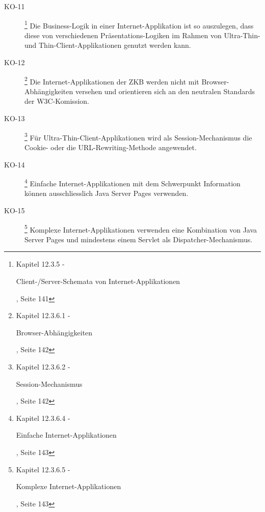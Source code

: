 \begin{description}
    \item[KO-11\label{itm:KO-11}]
    \footnote{\cite{ZkbHandbuchDerItArchitektur} Kapitel 12.3.5 -
    \begin{itshape}Client-/Server-Schemata von Internet-Applikationen\end{itshape}, Seite 141}
    Die Business-Logik in einer Internet-Applikation ist so auszulegen, dass
    diese von verschiedenen Präsentations-Logiken im Rahmen von Ultra-Thin- und
    Thin-Client-Applikationen genutzt werden kann.
    
    \item[KO-12\label{itm:KO-12}]
    \footnote{\cite{ZkbHandbuchDerItArchitektur} Kapitel 12.3.6.1 -
    \begin{itshape}Browser-Abhängigkeiten\end{itshape}, Seite 142}
    Die Internet-Applikationen der ZKB werden nicht mit Browser-Abhängigkeiten
    versehen und orientieren sich an den neutralen Standards der W3C-Komission.
    
    \item[KO-13\label{itm:KO-13}]
    \footnote{\cite{ZkbHandbuchDerItArchitektur} Kapitel 12.3.6.2 -
    \begin{itshape}Session-Mechanismus\end{itshape}, Seite 142}
    Für Ultra-Thin-Client-Applikationen wird als Session-Mechanismus die
    Cookie- oder die URL-Rewriting-Methode angewendet.
    
    \item[KO-14\label{itm:KO-14}]
    \footnote{\cite{ZkbHandbuchDerItArchitektur} Kapitel 12.3.6.4 -
    \begin{itshape}Einfache Internet-Applikationen\end{itshape}, Seite 143}
    Einfache Internet-Applikationen mit dem Schwerpunkt Information können
    ausschliesslich Java Server Pages verwenden.
    
    \item[KO-15\label{itm:KO-15}]
    \footnote{\cite{ZkbHandbuchDerItArchitektur} Kapitel 12.3.6.5 -
    \begin{itshape}Komplexe Internet-Applikationen\end{itshape}, Seite 143}
    Komplexe Internet-Applikationen verwenden eine Kombination von Java Server
    Pages und mindestens einem Servlet als Dispatcher-Mechanismus.
    

\end{description}
